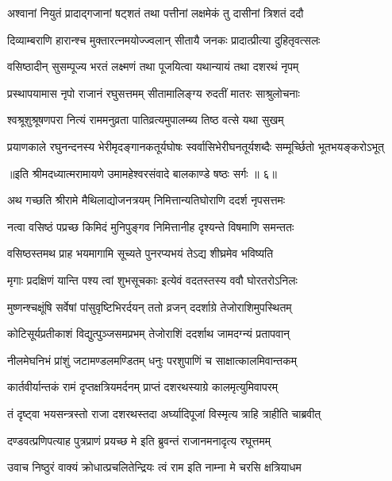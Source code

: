 \twolineshloka
{अश्वानां नियुतं प्रादाद्गजानां षट्शतं तथा}
{पत्तीनां लक्षमेकं तु दासीनां त्रिशतं ददौ} %

\twolineshloka
{दिव्याम्बराणि हारान्श्च मुक्तारत्नमयोज्ज्वलान्}
{सीतायै जनकः प्रादात्प्रीत्या दुहितृवत्सलः} %

\twolineshloka
{वसिष्ठादीन् सुसम्पूज्य भरतं लक्ष्मणं तथा}
{पूजयित्वा यथान्यायं तथा दशरथं नृपम्} %

\twolineshloka
{प्रस्थापयामास नृपो राजानं रघुसत्तमम्}
{सीतामालिङ्ग्य रुदतीं मातरः साश्रुलोचनाः} %

\twolineshloka
{श्वश्रूशुश्रूषणपरा नित्यं राममनुव्रता}
{पातिव्रत्यमुपालम्ब्य तिष्ठ वत्से यथा सुखम्} %

\twolineshloka
{प्रयाणकाले रघुनन्दनस्य भेरीमृदङ्गानकतूर्यघोषः}
{स्वर्वासिभेरीघनतूर्यशब्दैः सम्मूर्च्छितो भूतभयङ्करोऽभूत्} %

{॥इति श्रीमदध्यात्मरामायणे उमामहेश्वरसंवादे
बालकाण्डे षष्ठः सर्गः ॥ ६॥
}




\twolineshloka
{अथ गच्छति श्रीरामे मैथिलाद्योजनत्रयम्}
{निमित्तान्यतिघोराणि ददर्श नृपसत्तमः} %

\twolineshloka
{नत्वा वसिष्ठं पप्रच्छ किमिदं मुनिपुङ्गव}
{निमित्तानीह दृश्यन्ते विषमाणि समन्ततः} %

\twolineshloka
{वसिष्ठस्तमथ प्राह भयमागामि सूच्यते}
{पुनरप्यभयं तेऽद्य शीघ्रमेव भविष्यति} %

\twolineshloka
{मृगाः प्रदक्षिणं यान्ति पश्य त्वां शुभसूचकाः}
{इत्येवं वदतस्तस्य ववौ घोरतरोऽनिलः} %

\twolineshloka
{मुष्णन्श्चक्षूंषि सर्वेषां पांसुवृष्टिभिरर्दयन्}
{ततो व्रजन् ददर्शाग्रे तेजोराशिमुपस्थितम्} %

\twolineshloka
{कोटिसूर्यप्रतीकाशं विद्युत्पुञ्जसमप्रभम्}
{तेजोराशिं ददर्शाथ जामदग्न्यं प्रतापवान्} %

\twolineshloka
{नीलमेघनिभं प्रांशुं जटामण्डलमण्डितम्}
{धनुः परशुपाणिं च साक्षात्कालमिवान्तकम्} %

\twolineshloka
{कार्तवीर्यान्तकं रामं दृप्तक्षत्रियमर्दनम्}
{प्राप्तं दशरथस्याग्रे कालमृत्युमिवापरम्} %

\twolineshloka
{तं दृष्ट्वा भयसन्त्रस्तो राजा दशरथस्तदा}
{अर्घ्यादिपूजां विस्मृत्य त्राहि त्राहीति चाब्रवीत्} %

\twolineshloka
{दण्डवत्प्रणिपत्याह पुत्रप्राणं प्रयच्छ मे}
{इति ब्रुवन्तं राजानमनादृत्य रघूत्तमम्} %

\twolineshloka
{उवाच निष्ठुरं वाक्यं क्रोधात्प्रचलितेन्द्रियः}
{त्वं राम इति नाम्ना मे चरसि क्षत्रियाधम} %

